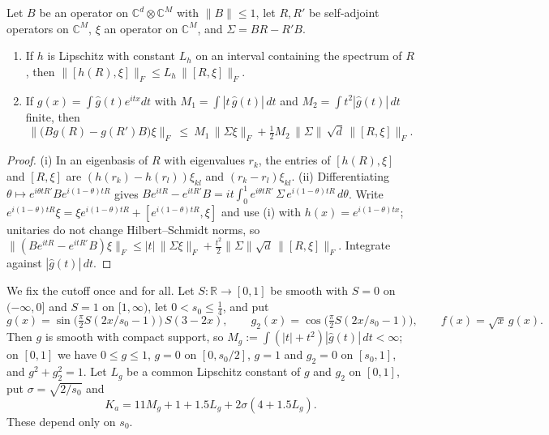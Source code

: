 \begin{lemma}\label{lem:twisted}
Let $B$ be an operator on $\mathbb C^d\otimes\mathbb C^M$ with $\|B\|\le1$, let $R,R'$ be self-adjoint operators on $\mathbb C^M$, $\xi$ an operator on $\mathbb C^M$, and
$\Sigma=BR-R'B$.
\begin{enumerate}[label=(\roman*),itemsep=1pt]
\item If $h$ is Lipschitz with constant $L_h$ on an interval containing the spectrum of $R$, then $\|[h(R),\xi]\|_F\le L_h\,\|[R,\xi]\|_F$.
\item If $g(x)=\int\hat g(t)e^{itx}dt$ with $M_1=\int|t\,\hat g(t)|\,dt$ and $M_2=\int t^2|\hat g(t)|\,dt$ finite, then
\[
\bigl\|\bigl(Bg(R)-g(R')B\bigr)\xi\bigr\|_F\ \le\ M_1\,\|\Sigma\xi\|_F+\tfrac12M_2\,\|\Sigma\|\,\sqrt d\,\|[R,\xi]\|_F .
\]
\end{enumerate}
\end{lemma}

\begin{proof}
(i) In an eigenbasis of $R$ with eigenvalues $r_k$, the entries of $[h(R),\xi]$ and $[R,\xi]$ are $(h(r_k)-h(r_l))\xi_{kl}$ and $(r_k-r_l)\xi_{kl}$.
(ii) Differentiating $\theta\mapsto e^{i\theta tR'}Be^{i(1-\theta)tR}$ gives
$Be^{itR}-e^{itR'}B=it\int_0^1e^{i\theta tR'}\,\Sigma\,e^{i(1-\theta)tR}\,d\theta$. Write $e^{i(1-\theta)tR}\xi=\xi e^{i(1-\theta)tR}+[e^{i(1-\theta)tR},\xi]$ and use
(i) with $h(x)=e^{i(1-\theta)tx}$; unitaries do not change Hilbert--Schmidt norms, so
$\|(Be^{itR}-e^{itR'}B)\xi\|_F\le|t|\,\|\Sigma\xi\|_F+\frac{t^2}2\|\Sigma\|\sqrt d\,\|[R,\xi]\|_F$. Integrate against $|\hat g(t)|\,dt$.
\end{proof}

We fix the cutoff once and for all. Let $S:\mathbb R\to[0,1]$ be smooth with $S=0$ on $(-\infty,0]$ and $S=1$ on $[1,\infty)$, let $0<s_0\le\frac14$, and put
\[
g(x)=\sin\bigl(\tfrac\pi2S(2x/s_0-1)\bigr)\,S(3-2x),\qquad g_2(x)=\cos\bigl(\tfrac\pi2S(2x/s_0-1)\bigr),\qquad f(x)=\sqrt x\,g(x).
\]
Then $g$ is smooth with compact support, so $M_g:=\int(|t|+t^2)|\hat g(t)|\,dt<\infty$; on $[0,1]$ we have $0\le g\le1$, $g=0$ on $[0,s_0/2]$,
$g=1$ and $g_2=0$ on $[s_0,1]$, and $g^2+g_2^2=1$. Let $L_g$ be a common Lipschitz constant of $g$ and $g_2$ on $[0,1]$, put $\sigma=\sqrt{2/s_0}$ and
\[
K_a=11M_g+1+1.5L_g+2\sigma(4+1.5L_g).
\]
These depend only on $s_0$.

